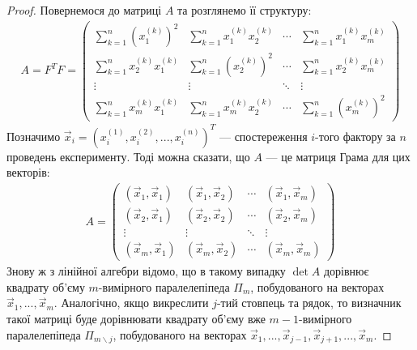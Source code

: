 \begin{proof}
    Повернемося до матриці $A$ та розглянемо її структуру:
    \begin{gather*}
        A = F^T F = \begin{pmatrix}
            \sum\limits_{k=1}^n \left(x_1^{(k)}\right)^2 & \sum\limits_{k=1}^n x_1^{(k)} x_2^{(k)} & \cdots & \sum\limits_{k=1}^n x_1^{(k)} x_m^{(k)} \\
            \sum\limits_{k=1}^n x_2^{(k)} x_1^{(k)} & \sum\limits_{k=1}^n \left(x_2^{(k)}\right)^2 & \cdots & \sum\limits_{k=1}^n x_2^{(k)} x_m^{(k)} \\
            \vdots & \vdots & \ddots & \vdots \\
            \sum\limits_{k=1}^n x_m^{(k)} x_1^{(k)} & \sum\limits_{k=1}^n x_m^{(k)} x_2^{(k)} & \cdots & \sum\limits_{k=1}^n \left(x_m^{(k)}\right)^2
        \end{pmatrix}
    \end{gather*}
    Позначимо $\vec{x}_i = \left(
        x_i^{(1)}, x_i^{(2)}, ..., x_i^{(n)}
    \right)^T$ --- спостереження $i$-того фактору за $n$ проведень експерименту. Тоді можна сказати, що $A$ ---
    це матриця Грама для цих векторів:
    \begin{gather*}
        A = \begin{pmatrix}
            (\vec{x}_1, \vec{x}_1) & (\vec{x}_1, \vec{x}_2) & \cdots & (\vec{x}_1, \vec{x}_m) \\
            (\vec{x}_2, \vec{x}_1) & (\vec{x}_2, \vec{x}_2) & \cdots & (\vec{x}_2, \vec{x}_m) \\
            \vdots & \vdots & \ddots & \vdots \\
            (\vec{x}_m, \vec{x}_1) & (\vec{x}_m, \vec{x}_2) & \cdots & (\vec{x}_m, \vec{x}_m)
        \end{pmatrix}
    \end{gather*}
    Знову ж з лінійної алгебри відомо, що в такому випадку $\det A$ дорівнює квадрату об'єму
    $m$-вимірного паралелепіпеда $\Pi_m$, побудованого на векторах $\vec{x}_1, ..., \vec{x}_m$. Аналогічно,
    якщо викреслити $j$-тий стовпець та рядок, то визначник такої матриці буде дорівнювати квадрату об'єму 
    вже $m-1$-вимірного паралелепіпеда $\Pi_{m \backslash j}$, побудованого на векторах 
    $\vec{x}_1, ..., \vec{x}_{j-1}, \vec{x}_{j+1}, ..., \vec{x}_m$.


\end{proof}
